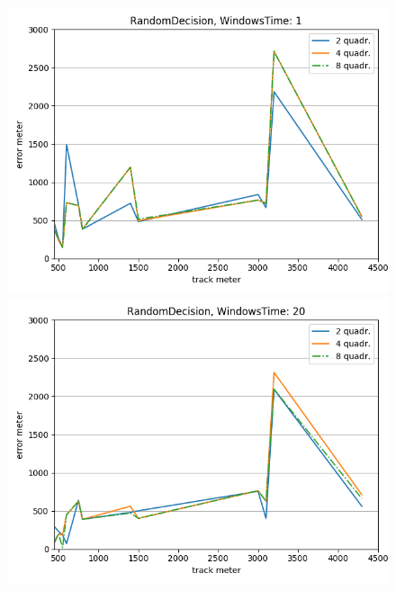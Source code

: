 \documentclass[12pt,a4paper,openright,twoside]{report}
\begin{document}
\begin{figure}[H]
\centering 
\includegraphics[scale=0.4]{thirdChartRandomDecision-1} 
\includegraphics[scale=0.4]{thirdChartRandomDecision-20} 
\end{figure}
\end{document}
